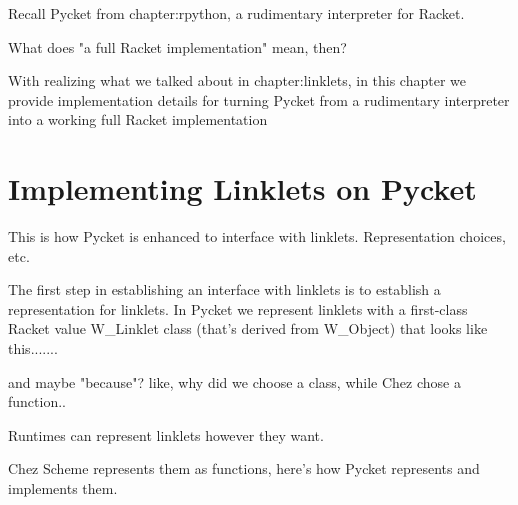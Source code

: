 	\begin{paragraph-here}%
		Recall Pycket from chapter:rpython, a rudimentary interpreter for Racket.	\end{paragraph-here}

	\begin{paragraph-here}%
		What does "a full Racket implementation" mean, then?
	\end{paragraph-here}

	\begin{paragraph-here}%
		With realizing what we talked about in chapter:linklets, in this chapter we provide implementation details for turning Pycket from a rudimentary interpreter into a working full Racket implementation
	\end{paragraph-here}

	\section[\texorpdfstring{Implementing Linklets on Pycket}{Linklets on Pycket}]{Implementing Linklets on Pycket}

		\begin{mainpoint}
			This is how Pycket is enhanced to interface with linklets. Representation choices, etc.
		\end{mainpoint}

		\begin{paragraph-here}%
			The first step in establishing an interface with linklets is to establish a representation for linklets. In Pycket we represent linklets with a first-class Racket value W\_Linklet class (that's derived from W\_Object) that looks like this.......

			and maybe "because"? like, why did we choose a class, while Chez chose a function..

			Runtimes can represent linklets however they want.

		Chez Scheme represents them as functions, here's how Pycket represents and implements them.
		\end{paragraph-here}


